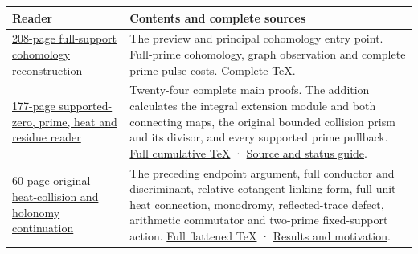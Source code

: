 \documentclass[
]{article}
\newcounter{none} %
\begin{document}
{\def\LTcaptype{none} %
\begin{longtable}[]{@{}
  >{\raggedright\arraybackslash}p{}
  >{\raggedright\arraybackslash}p{}@{}}
\toprule\noalign{}
\begin{minipage}[b]{\linewidth}\raggedright
Reader
\end{minipage} & \begin{minipage}[b]{\linewidth}\raggedright
Contents and complete sources
\end{minipage} \\
\midrule\noalign{}
\endhead
\bottomrule\noalign{}
\endlastfoot
\href{https://zenodo.org/records/22908504/files/154-splitzero-full-support-graph-pulses.pdf?download=1}{208-page
full-support cohomology reconstruction} & The preview and principal
cohomology entry point. Full-prime cohomology, graph observation and
complete prime-pulse costs.
\href{https://github.com/KokunoYumeto/zeta-function-research-reader/blob/5a89872598df0902b7c1393cf8e4692ca3010a95/workbenches/splitzero-tandem/continuations/20260923-cohomology-heat-residue/graph-pulse/FULL_RECONSTRUCTION.tex}{Complete
TeX}. \\
\href{https://zenodo.org/records/22908504/files/159-splitzero-collision-prism-and-extension.pdf?download=1}{177-page
supported-zero, prime, heat and residue reader} & Twenty-four complete
main proofs. The addition calculates the integral extension module and
both connecting maps, the original bounded collision prism and its
divisor, and every supported prime pullback.
\href{https://github.com/KokunoYumeto/zeta-function-research-reader/blob/3c022a0adde0a6aa3d8fc8e43ef42795d88e44b0/workbenches/splitzero-tandem/branches/tau-zero-prime-positivity/TAU_ZERO_PRIME_POSITIVITY.tex}{Full
cumulative TeX} ·
\href{https://github.com/KokunoYumeto/zeta-function-research-reader/blob/3c022a0adde0a6aa3d8fc8e43ef42795d88e44b0/workbenches/splitzero-tandem/branches/tau-zero-prime-positivity/PUBLICATION_COMPANION.md}{Source
and status guide}. \\
\href{https://zenodo.org/records/22908504/files/160-splitzero-heat-collision-holonomy.pdf?download=1}{60-page
original heat-collision and holonomy continuation} & The preceding
endpoint argument, full conductor and discriminant, relative cotangent
linking form, full-unit heat connection, monodromy, reflected-trace
defect, arithmetic commutator and two-prime fixed-support action.
\href{https://github.com/KokunoYumeto/zeta-function-research-reader/blob/3c022a0adde0a6aa3d8fc8e43ef42795d88e44b0/workbenches/splitzero-tandem/continuations/20260923-supported-zero-collision-holonomy/SUPPORTED_ZERO_COLLISION_HOLONOMY.tex}{Full
flattened TeX} ·
\href{https://github.com/KokunoYumeto/zeta-function-research-reader/blob/3c022a0adde0a6aa3d8fc8e43ef42795d88e44b0/workbenches/splitzero-tandem/continuations/20260923-supported-zero-collision-holonomy/NEW_RESULTS_2026-09-23.md}{Results
and motivation}. \\
\end{longtable}
}
\end{document}
